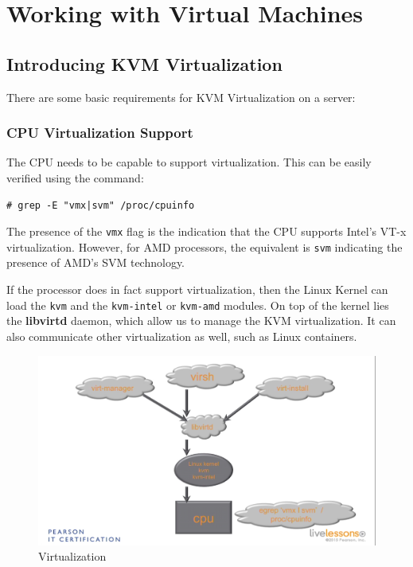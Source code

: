 \chapter{Working with Virtual Machines}

	\section{Introducing KVM Virtualization}
There are some basic requirements for KVM Virtualization on a server: 

\subsection{CPU Virtualization Support}
The CPU needs to be capable to support virtualization. This can be easily verified using the command:

\vspace{-15pt}
\begin{verbatim}
# grep -E "vmx|svm" /proc/cpuinfo
\end{verbatim}
\vspace{-10pt}

\noindent
The presence of the \verb|vmx| flag is the indication that the CPU supports Intel's VT-x virtualization. However, for AMD processors, the equivalent is \verb|svm| indicating the presence of AMD's SVM technology. 

If the processor does in fact support virtualization, then the Linux Kernel can load the \verb|kvm| and the \verb|kvm-intel| or \verb|kvm-amd| modules. On top of the kernel lies the \textbf{libvirtd} daemon, which allow us to manage the KVM virtualization. It can also communicate other virtualization as well, such as Linux containers. 

\begin{figure}[H]
	\centering
	\includegraphics[width=0.9\linewidth]{Mod2/chapters/2.12.a}
	\caption{Virtualization}
	\label{fig:2 Virtualization}
\end{figure}


